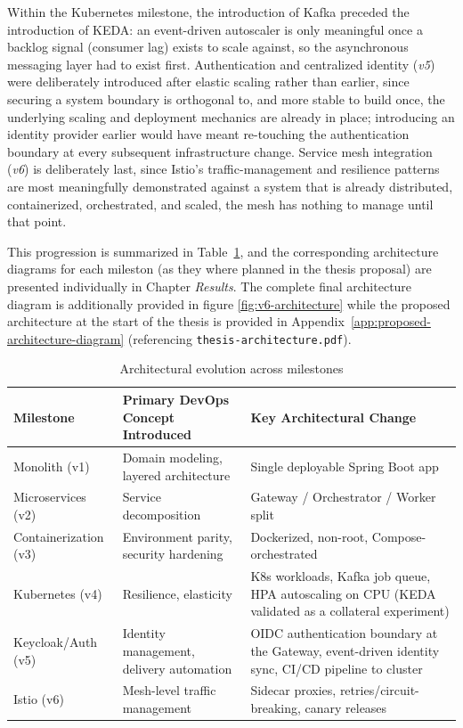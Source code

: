 \documentclass[twoside]{supsistudent}
\begin{document}
Within the Kubernetes milestone, the introduction of Kafka preceded the introduction of KEDA: an event-driven autoscaler is only meaningful once a backlog signal (consumer lag) exists to scale against, so the asynchronous messaging layer had to exist first. Authentication and centralized identity (\emph{v5}) were deliberately introduced after elastic scaling rather than earlier, since securing a system boundary is orthogonal to, and more stable to build once, the underlying scaling and deployment mechanics are already in place; introducing an identity provider earlier would have meant re-touching the authentication boundary at every subsequent infrastructure change. Service mesh integration (\emph{v6}) is deliberately last, since Istio's traffic-management and resilience patterns are most meaningfully demonstrated against a system that is already distributed, containerized, orchestrated, and scaled, the mesh has nothing to manage until that point.

This progression is summarized in Table~\ref{tab:architectural-evolution}, and the corresponding architecture diagrams for each mileston (as they where planned in the thesis proposal) are presented individually in Chapter \emph{Results}. The complete final architecture diagram is additionally provided in figure \ref{fig:v6-architecture} while the proposed architecture at the start of the thesis is provided in Appendix~\ref{app:proposed-architecture-diagram} (referencing \texttt{thesis-architecture.pdf}).

\begin{table}[h]
\centering
\begin{tabular}{|p{3cm}|p{5cm}|p{6cm}|}
\hline
\textbf{Milestone} &
\textbf{Primary DevOps Concept Introduced} &
\textbf{Key Architectural Change} \\
\hline
Monolith \newline (v1) &
Domain modeling, layered architecture &
Single deployable Spring Boot app \\
\hline
Microservices \newline (v2) &
Service decomposition &
Gateway / Orchestrator / Worker split \\
\hline
Containerization \newline (v3) &
Environment parity, security hardening &
Dockerized, non-root, Compose-orchestrated \\
\hline
Kubernetes \newline (v4) &
Resilience, elasticity &
K8s workloads, Kafka job queue, HPA autoscaling on CPU (KEDA validated as a collateral experiment) \\
\hline
Keycloak/Auth \newline (v5) &
Identity management, delivery automation &
OIDC authentication boundary at the Gateway, event-driven identity sync, CI/CD pipeline to cluster \\
\hline
Istio \newline (v6)&
Mesh-level traffic management &
Sidecar proxies, retries/circuit-breaking, canary releases \\
\hline
\end{tabular}
\caption{Architectural evolution across milestones}
\label{tab:architectural-evolution}
\end{table}
\end{document}
